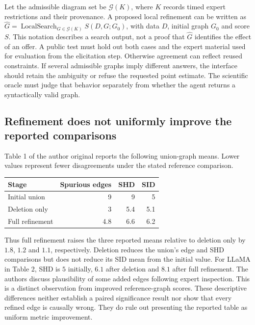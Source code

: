 Let the admissible diagram set be $\mathcal{G}(K)$, where $K$ records timed
expert restrictions and their provenance. A proposed local refinement can be
written as $\widehat G=\operatorname{LocalSearch}_{G\in\mathcal{G}(K)}
S(D,G;G_0)$, with data $D$, initial graph $G_0$ and score $S$. This notation
describes a search output, not a proof that $\widehat G$ identifies the effect
of an offer. A public test must hold out both cases and the expert material used
for evaluation from the elicitation step. Otherwise agreement can reflect
reused constraints. If several admissible graphs imply different answers, the
interface should retain the ambiguity or refuse the requested point estimate.
The scientific oracle must judge that behavior separately from whether the
agent returns a syntactically valid graph.\citep{exec24_ecmo_reference}

\subsection{Refinement does not uniformly improve the reported comparisons}
Table 1 of the author original reports the following union-graph means. Lower
values represent fewer disagreements under the stated reference comparison.
\citep{exec24_ecmo_original}
\begin{center}
\begin{tabular}{lrrr}
\toprule
Stage & Spurious edges & SHD & SID \\
\midrule
Initial union & 9 & 9 & 5 \\
Deletion only & 3 & 5.4 & 5.1 \\
Full refinement & 4.8 & 6.6 & 6.2 \\
\bottomrule
\end{tabular}
\end{center}
Thus full refinement raises the three reported means relative to deletion only
by $1.8$, $1.2$ and $1.1$, respectively. Deletion reduces the union's edge and
SHD comparisons but does not reduce its SID mean from the initial value.
For LLaMA in Table 2, SHD is $5$ initially, $6.1$ after deletion and $8.1$
after full refinement. The authors discuss plausibility of some added edges
following expert inspection. This is a distinct observation from improved
reference-graph scores. These descriptive differences neither establish a
paired significance result nor show that every refined edge is causally wrong.
They do rule out presenting the reported table as uniform metric improvement.
\citep{exec24_ecmo_original,exec24_ecmo_reference}

